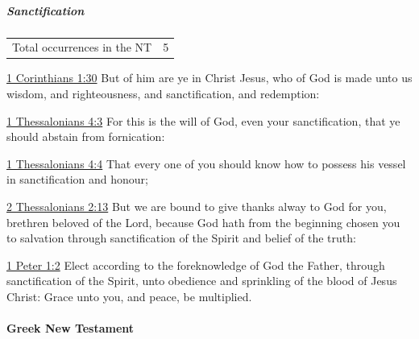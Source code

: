			\subparagraph{Sanctification}
	
				\begin{tabular}{ll}
					Total occurrences in the NT & 5
				\end{tabular}
				
				\begin{compactdesc}
					\item[{\hyperref[1CORINTHIANS-1-30]{1 Corinthians 1:30}}] But of him are ye in Christ Jesus, who of God is made unto us wisdom, and righteousness, and sanctification, and redemption:
					\item[{\hyperref[1THESSALONIANS-4-3]{1 Thessalonians 4:3}}] For this is the will of God, even your sanctification, that ye should abstain from fornication:
					\item[{\hyperref[1THESSALONIANS-4-4]{1 Thessalonians 4:4}}] That every one of you should know how to possess his vessel in sanctification and honour;
					\item[{\hyperref[2THESSALONIANS-2-13]{2 Thessalonians 2:13}}] But we are bound to give thanks alway to God for you, brethren beloved of the Lord, because God hath from the beginning chosen you to salvation through sanctification of the Spirit and belief of the truth:
					\item[{\hyperref[1PETER-1-2]{1 Peter 1:2}}] Elect according to the foreknowledge of God the Father, through sanctification of the Spirit, unto obedience and sprinkling of the blood of Jesus Christ: Grace unto you, and peace, be multiplied.
				\end{compactdesc}
			
		\paragraph{Greek New Testament} %
			\label{SANCTIFICATION-GREEK}
		
			\subparagraph{\texorpdfstring{}{}}
				\label{HAGIAZO}
			
